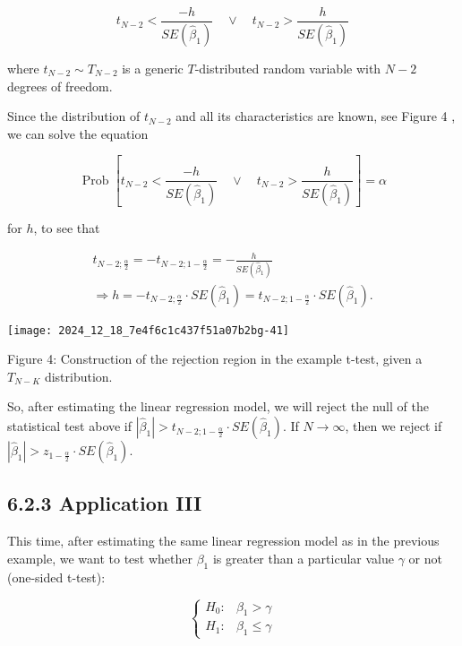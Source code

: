 $$
t_{N-2}<\frac{-h}{S E\left(\widehat{\beta}_{1}\right)} \quad \vee \quad t_{N-2}>\frac{h}{S E\left(\widehat{\beta}_{1}\right)}
$$

where $t_{N-2} \sim T_{N-2}$ is a generic $T$-distributed random variable with $N-2$ degrees of freedom.

Since the distribution of $t_{N-2}$ and all its characteristics are known, see Figure 4 , we can solve the equation

$$
\operatorname{Prob}\left[t_{N-2}<\frac{-h}{S E\left(\widehat{\beta}_{1}\right)} \quad \vee \quad t_{N-2}>\frac{h}{S E\left(\widehat{\beta}_{1}\right)}\right]=\alpha
$$

for $h$, to see that

$$
\begin{gathered}
t_{N-2 ; \frac{\alpha}{2}}=-t_{N-2 ; 1-\frac{\alpha}{2}}=-\frac{h}{S E\left(\widehat{\beta}_{1}\right)} \\
\Longrightarrow h=-t_{N-2 ; \frac{\alpha}{2}} \cdot S E\left(\widehat{\beta}_{1}\right)=t_{N-2 ; 1-\frac{\alpha}{2}} \cdot S E\left(\widehat{\beta}_{1}\right) .
\end{gathered}
$$

\begin{center}
\texttt{[image: 2024\_12\_18\_7e4f6c1c437f51a07b2bg-41]}
\end{center}

Figure 4: Construction of the rejection region in the example t-test, given a $T_{N-K}$ distribution.

So, after estimating the linear regression model, we will reject the null of the statistical test above if $\left|\widehat{\beta}_{1}\right|>t_{N-2 ; 1-\frac{\alpha}{2}} \cdot S E\left(\widehat{\beta}_{1}\right)$. If $N \longrightarrow \infty$, then we reject if $\left|\widehat{\beta}_{1}\right|>z_{1-\frac{\alpha}{2}} \cdot S E\left(\widehat{\beta}_{1}\right)$.

\subsection*{6.2.3 Application III}
This time, after estimating the same linear regression model as in the previous example, we want to test whether $\beta_{1}$ is greater than a particular value $\gamma$ or not (one-sided t-test):

$$
\begin{cases}H_{0}: & \beta_{1}>\gamma \\ H_{1}: & \beta_{1} \leq \gamma\end{cases}
$$

